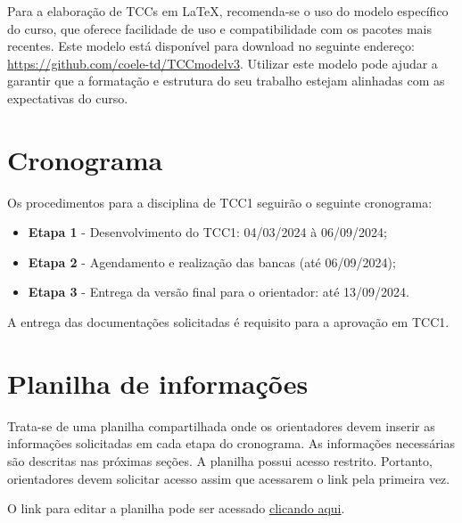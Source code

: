 \documentclass[a4paper, 12pt]{article}
\newcommand{\startdate}{04/03/2024}		%
\newcommand{\agendadate}{06/09/2024}	%
\newcommand{\bancadate}{06/09/2024}		%
\newcommand{\finaldate}{13/09/2024}		%
\begin{document}
	Para a elaboração de TCCs em \LaTeX{}, recomenda-se o uso do modelo específico do curso, que oferece facilidade de uso e compatibilidade com os pacotes mais recentes. Este modelo está disponível para download no seguinte endereço: \url{https://github.com/coele-td/TCCmodelv3}. Utilizar este modelo pode ajudar a garantir que a formatação e estrutura do seu trabalho estejam alinhadas com as expectativas do curso.


    \section{Cronograma}
    \label{sec:CRO}
    
    Os procedimentos para a disciplina de TCC1 seguirão o seguinte cronograma:
    \begin{itemize}
    	\item \textbf{Etapa 1} - Desenvolvimento do TCC1: \startdate{} à \agendadate;
    	\item \textbf{Etapa 2} - Agendamento  e realização das bancas (até \bancadate);
    	\item \textbf{Etapa 3} - Entrega da versão final para o orientador: até \finaldate.    	
    \end{itemize}

	A entrega das documentações solicitadas é requisito para a aprovação em TCC1.

	\section{Planilha de informações}
	\label{sec:pla}
	
	Trata-se de uma planilha compartilhada onde os orientadores  devem inserir as informações solicitadas em cada etapa do cronograma. As informações necessárias são descritas nas próximas seções. A planilha possui acesso restrito. Portanto, orientadores devem solicitar acesso assim que acessarem o link pela primeira vez.

	
	O link para editar a planilha pode ser acessado \href{https://docs.google.com/spreadsheets/d/1AfsG1P6wrw42CbZCDbQzsXFXmxfrMmZ7gpn8NvR8cq4/edit?usp=sharing}{clicando aqui}.
	
\end{document}

